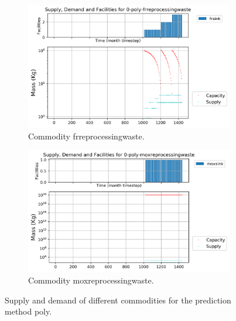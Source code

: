 \documentclass[11pt]{article}
\begin{document}
\begin{figure}[H]
	\centering
	\begin{subfigure}[t]{0.45\textwidth}
		\centering
		\includegraphics[width=\linewidth]{23-figures/0-poly-frreprocessingwaste.png} 
		\caption{Commodity frreprocessingwaste.}
		\label{fig:29-frreprocessingwaste}
	\end{subfigure}
	\vspace{1cm}
	\begin{subfigure}[t]{0.45\textwidth}
		\centering
		\includegraphics[width=\linewidth]{29-figures/0-poly-moxreprocessingwaste.png} 
		\caption{Commodity moxreprocessingwaste.}
		\label{fig:29-moxreprocessingwaste}
	\end{subfigure}
	\hfill
	\caption{Supply and demand of different commodities for the prediction method poly.}
	\label{fig:29-waste}
\end{figure}
\end{document}
